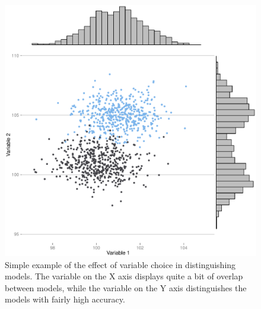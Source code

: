 \begin{figure}[ht]
\centering
\includegraphics[scale=0.6]{graphics/ctmixtures/equifinality-variable-effect.pdf}
\caption{Simple example of the effect of variable choice in distinguishing models.  The variable on the X axis displays quite a bit of overlap between models, while the variable on the Y axis distinguishes the models with fairly high accuracy.}
\label{img:variables-equifinality-example}
\end{figure}

